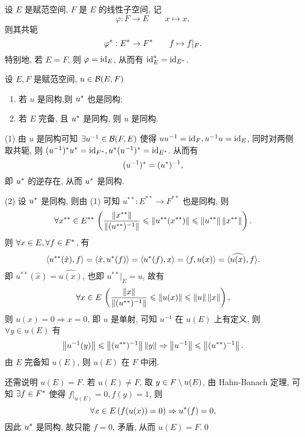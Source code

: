 	\begin{Example}
		设 $ E $ 是赋范空间, $ F $ 是 $ E $ 的线性子空间, 记
		\[
			\varphi: F\to E\qquad x\mapsto x,
		\]
		则其共轭
		\[
			\varphi^{*}: E^{*}\to F^{*}\qquad f\mapsto f|_{F}.
		\]
		特别地, 若 $ E=F $, 则 $ \varphi=\mathrm{id}_{E} $, 从而有 $ \mathrm{id}_{E}^{*}=\mathrm{id}_{E^{*}} $.
	\end{Example}	
	\begin{Theorem}
		设 $ E, F $ 是赋范空间, $ u\in\mathcal{B}(E, F) $
		\begin{enumerate}[(1)]
			\item 若 $ u $ 是同构,则 $ u^{*} $ 也是同构;
			\item 若 $ E $ 完备, 且 $ u^{*} $ 是同构, 则 $ u $ 是同构.
		\end{enumerate}
	\end{Theorem}
	\begin{Proof}
		(1) 由 $ u $ 是同构可知 $ \exists u^{-1}\in\mathcal{B}(F, E) $ 使得 $ uu^{-1}=\mathrm{id}_{F}, u^{-1}u=\mathrm{id}_{E} $, 同时对两侧取共轭, 则 $ (u^{-1})^{*}u^{*}=\mathrm{id}_{F^{*}},u^{*}(u^{-1})^{*}=\mathrm{id}_{E^{*}}  $. 从而有
		\[
			(u^{-1})^{*}=(u^{*})^{-1},
		\]
		即 $ u^{*} $ 的逆存在, 从而 $ u^{*} $ 是同构.

		(2) 设 $ u^{*} $ 是同构, 则由 (1) 可知 $ u^{**}: E^{**}\to F^{**} $ 也是同构, 则
		\[
			\forall x^{**}\in E^{**}\,\left(\frac{\left\| x^{**} \right\|}{\left\| (u^{**})^{-1} \right\|}\leqslant\left\| u^{**}(x^{**}) \right\|\leqslant\left\| u^{**} \right\|\left\| x^{**} \right\|\right).
		\]
		则 $ \forall x\in E, \forall f\in F^{*} $, 有
		\[
			\left\langle u^{**}(\hat{x}), f \right\rangle=\left\langle \hat{x}, u^{*}(f) \right\rangle=\left\langle u^{*}(f), x \right\rangle=\left\langle f, u(x) \right\rangle=\langle\widehat{u(x)}, f\rangle.
		\]
		即 $ u^{**}(\hat{x})=\widehat{u(x)} $, 也即 $ u^{**}|_{E}=u $, 故有
		\[
			\forall x\in E\,\left( \frac{\left\| x \right\|}{\left\| (u^{**})^{-1} \right\|}\leqslant\left\| u(x) \right\|\leqslant\left\| u \right\|\left\| x \right\| \right),
		\]
		则 $ u(x)=0\Longrightarrow x=0 $, 即 $ u $ 是单射, 可知 $ u^{-1} $ 在 $ u(E) $ 上有定义, 则 $ \forall y\in u(E) $ 有
		\[
			\left\| u^{-1}(y) \right\|\leqslant\left\| (u^{**})^{-1} \right\|\left\| y \right\|\Rightarrow \left\| u^{-1} \right\|\leqslant\left\| (u^{**})^{-1} \right\|.
		\]
		由 $ E $ 完备知 $ u(E) $, 则 $ u(E) $ 在 $ F $ 中闭.

		还需说明 $ u(E)=F $. 若 $ u(E)\ne F $, 取 $ y\in F\setminus u(E) $, 由 Hahn-Banach 定理, 可知 $ \exists f\in F^{*} $ 使得 $ f|_{u(E)}=0, f(y)=1 $, 则
		\[
			\forall x\in E\,(f(u(x))=0)\Rightarrow u^{*}(f)=0,
		\]
		因此 $ u^{*} $ 是同构, 故只能 $ f=0 $, 矛盾, 从而 $ u(E)=F $.\qed
	\end{Proof}

